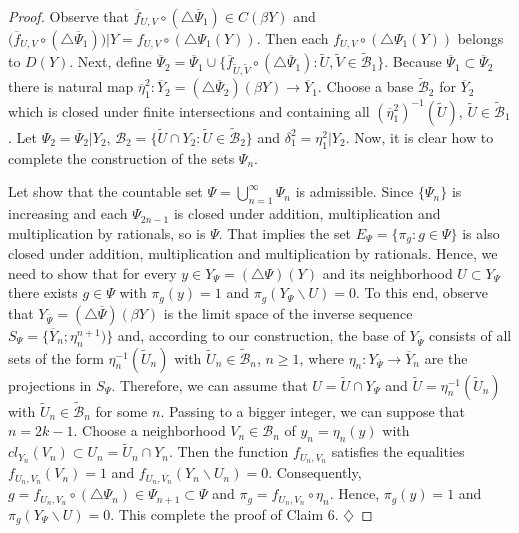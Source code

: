\documentclass[10pt,a4paper]{amsart}
\begin{document}
\begin{proof}
Observe that $\overline f_{U,V}\circ(\triangle\overline\Psi_{1})\in C(\beta Y)$ and $\big(\overline f_{U,V}\circ(\triangle\overline\Psi_{1})\big)|Y=f_{U,V}\circ(\triangle\Psi_{1}(Y))$. Then
each $f_{U,V}\circ(\triangle\Psi_{1}(Y))$ belongs to $D(Y)$. Next, define $\overline\Psi_2=\overline\Psi_1\cup\{\overline f_{\widetilde U,\widetilde V}\circ(\triangle\overline\Psi_{1}):\widetilde U,\widetilde V\in\widetilde{\mathcal B}_1\}$. Because $\overline \Psi_1\subset\overline\Psi_2$ there is natural map $\overline\eta^2_1:\overline Y_2=(\triangle\overline\Psi_2)(\beta Y)\to \overline Y_1$. Choose a base $\widetilde{\mathcal B}_2$ for $\overline Y_2$ which is closed under finite intersections and containing all 
$(\overline\eta^2_1)^{-1}(\widetilde U)$, $\widetilde U\in\widetilde{\mathcal B}_1$. Let $\Psi_2=\overline\Psi_2|Y_2$, $\mathcal B_2=\{\widetilde U\cap Y_2:\widetilde U\in\widetilde{\mathcal B}_2\}$ and $\delta^2_1=\eta^2_1|Y_2$.
Now, it is clear how to complete the construction of the sets $\Psi_n$. 

Let show that the countable set 
$\Psi=\bigcup_{n=1}^\infty\Psi_n$ is admissible. Since $\{\Psi_n\}$ is increasing and each $\Psi_{2n-1}$ is closed under addition, multiplication and 
multiplication by rationals, so is $\Psi$. That implies the set $E_\Psi=\{\pi_g:g\in\Psi\}$ is also closed under addition, multiplication and multiplication by rationals. Hence, we need to show that for every $y\in Y_\Psi=(\triangle\Psi)(Y)$ and its neighborhood $U\subset Y_\Psi$ there exists $g\in\Psi$ with
$\pi_g(y)=1$ and $\pi_g(Y_\Psi\backslash U)=0$. To this end, observe that $Y_{\overline\Psi}=(\triangle\overline\Psi)(\beta Y)$ is the limit space of the inverse sequence
$S_\Psi=\{\overline Y_n;\eta^{n+1}_n)\}$ and, according to our construction, the base of $Y_{\overline\Psi}$ consists of all sets of the form $\eta_n^{-1}(\widetilde U_n)$ with $\widetilde U_n\in\widetilde{\mathcal B}_n$, $n\geq 1$, where 
$\eta_n:Y_{\overline\Psi}\to\overline Y_n$ are the projections in $S_\Psi$. Therefore, we can assume that $U=\widetilde U\cap Y_\Psi$ and $\widetilde U=\eta_n^{-1}(\widetilde U_n)$ with $\widetilde U_n\in\widetilde{\mathcal B}_n$ for some $n$. Passing to a bigger integer, we can suppose that $n=2k-1$. Choose a neighborhood $V_n\in\mathcal B_n$ of $y_n=\eta_n(y)$ with $cl_{Y_n}(V_n)\subset U_n=\widetilde U_n\cap Y_n$. Then the function $f_{U_n,V_n}$ satisfies the equalities $f_{U_n,V_n}(V_n)=1$ and $f_{U_n,V_n}(Y_n\backslash U_n)=0$. Consequently, $g=f_{U_n,V_n}\circ(\triangle\Psi_{n})\in\Psi_{n+1}\subset\Psi$ and $\pi_g=f_{U_n,V_n}\circ\eta_n$. 
Hence, $\pi_g(y)=1$ and $\pi_g(Y_\Psi\backslash U)=0$. This complete the proof of Claim 6. $\diamondsuit$




\end{proof}
\end{document}
